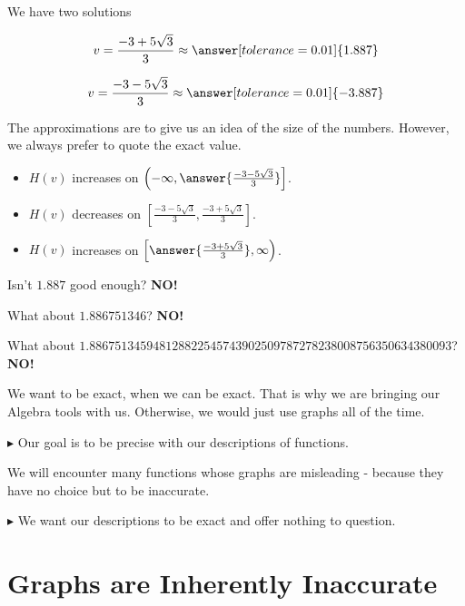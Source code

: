 \documentclass{ximera}
\begin{document}
\begin{example}
We have two solutions


\[  v =  \frac{-3 + 5\sqrt{3}}{3}  \approx  \answer[tolerance=0.01]{1.887} \]


\[  v =  \frac{-3 - 5\sqrt{3}}{3} \approx   \answer[tolerance=0.01]{-3.887} \]




The approximations are to give us an idea of the size of the numbers. However, we always prefer to quote the exact value.

\begin{itemize}
\item $H(v)$ increases on $\left( -\infty, \answer{\frac{-3 - 5\sqrt{3}}{3}}   \right]$.
\item $H(v)$ decreases on $\left[ \frac{-3 - 5\sqrt{3}}{3} , \frac{-3 + 5\sqrt{3}}{3}   \right]$.
\item $H(v)$ increases on $\left[ \answer{\frac{-3 + 5\sqrt{3}}{3}}, \infty  \right)$.
\end{itemize}



\end{example}





Isn't $1.887$ good enough?  \textbf{NO!}  

What about $1.886751346$? \textbf{NO!}  

What about $1.886751345948128822545743902509787278238008756350634380093$? \textbf{NO!}  

We want to be exact, when we can be exact.  That is why we are bringing our Algebra tools with us.  Otherwise, we would just use graphs all of the time.

\textbf{\textcolor{red!70!darkgray}{$\blacktriangleright$}} Our goal is to be precise with our descriptions of functions.


We will encounter many functions whose graphs are misleading - because they have no choice but to be inaccurate.

\textbf{\textcolor{red!70!darkgray}{$\blacktriangleright$}} We want our descriptions to be exact and offer nothing to question.









\section*{Graphs are Inherently Inaccurate}
\end{document}
